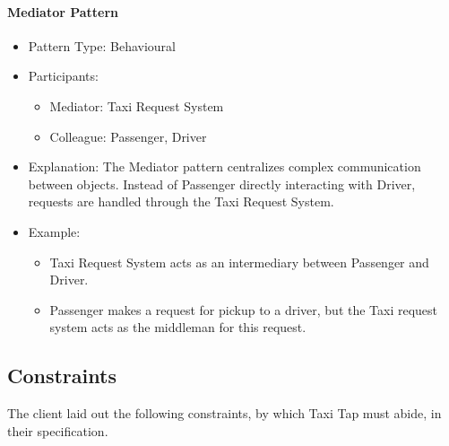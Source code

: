 \documentclass[a4paper,12pt]{article}
\begin{document}
\paragraph{Mediator Pattern}
\begin{itemize}
    \item Pattern Type: Behavioural
    \item Participants:
    \begin{itemize}
        \item Mediator: Taxi Request System
        \item Colleague: Passenger, Driver
    \end{itemize}
    \item Explanation: The Mediator pattern centralizes complex communication between objects. Instead of Passenger directly interacting with Driver, requests are handled through the Taxi Request System.
    \item Example:
    \begin{itemize}
        \item Taxi Request System acts as an intermediary between Passenger and Driver.
        \item Passenger makes a request for pickup to a driver, but the Taxi request system acts as the middleman for this request.
    \end{itemize}
\end{itemize}

\subsection{Constraints}
The client laid out the following constraints, by which Taxi Tap must abide, in their specification.
\end{document}
